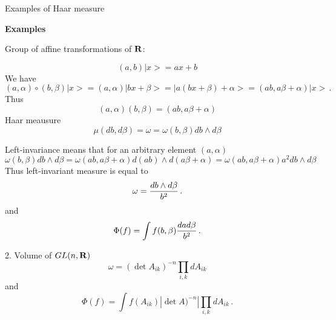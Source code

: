 





\baselineskip=14pt
\def\vare {\varepsilon}
\def\A {{\bf A}}
\def\t {\tilde}
\def\a {\alpha}
\def\K {{\bf K}}
\def\N {{\bf N}}
\def\V {{\cal V}}
\def\s {{\sigma}}
\def\S {{\Sigma}}
\def\s {{\sigma}}
\def\p{\partial}
\def\vare{{\varepsilon}}
\def\Q {{\bf Q}}
\def\D {{\cal D}}
\def\G {{\Gamma}}
\def\C {{\bf C}}
\def\M {{\cal M}}
\def\Z {{\bf Z}}
\def\U  {{\cal U}}
\def\H {{\cal H}}
\def\R  {{\bf R}}
\def\S  {{\bf S}}
\def\E  {{\bf E}}
\def\l {\lambda}
\def\ll {{\bf l}}
\def\degree {{\bf {\rm degree}\,\,}}
\def \finish {${\,\,\vrule height1mm depth2mm width 8pt}$}
\def \m {\medskip}
\def\p {\partial}
\def\r {{\bf r}}
\def\pt {{\bf p}}
\def\v {{\bf v}}
\def\n {{\bf n}}
\def\t {{\bf t}}
\def\b {{\bf b}}
\def\c {{\bf c }}
\def\e{{\bf e}}
\def\ac {{\bf a}}
\def \X   {{\bf X}}
\def \Y   {{\bf Y}}
\def \x   {{\bf x}}
\def \y   {{\bf y}}
\def \G{{\cal G}}



\centerline {Examples of  Haar measure}


{\bf Examples}

Group of affine transformations of $\R$:

               $$
  (a,b)| x>=ax+b
            $$
   We have
              $$
 (a,\a)\circ (b,\beta)|x>=(a,\a)|bx+\beta>=
 |a(bx+\beta)+\a>=(ab,a\beta+\a)|x>\,.
               $$
Thus
        $$
(a,\a)(b,\beta)=(ab,a\beta+\a)
        $$
Haar meausure
                  $$
\mu(db,d\beta)=\omega= \omega(b,\beta)db\wedge d\beta
                  $$

Left-invariance means that  for an arbitrary element
    $(a,\a)$
         $$
 \omega (b,\beta)db\wedge d\beta=
  \omega(ab,a\beta+\a)d(ab)\wedge d(a\beta+\a)=
      \omega(ab,a\beta+\a)a^2db\wedge d\beta
         $$
Thus  left-invariant measure is equal to
      $$
\omega={db\wedge d\beta\over b^2}\,.
      $$
and
     $$
\Phi(f)=\int f(b,\beta){dad\beta\over b^2}\,.
     $$


\bye



2.  Volume of $GL(n,\R)$
                   $$
         \omega=(\det A_{ik})^{-n} \prod_{i,k}dA_{ik}
                    $$
  and
              $$
   \Phi(f)=\int f\left(A_{ik}\right)\left|\det A)^{-n}\right|
    \prod_{i,k}dA_{ik}\,.
              $$
